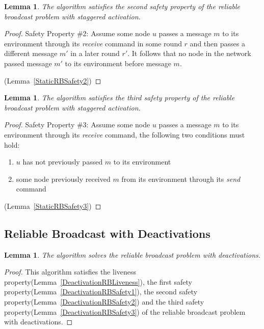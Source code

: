 \documentclass[english]{article}
\newtheorem{lemma}[theorem]{Lemma}
\begin{document}
\begin{lemma}
\label{StaggeredRBSafety2}
The algorithm satisfies the second safety property of the reliable broadcast problem with staggered activation.
\end{lemma}
\begin{proof}
Safety Property \#2: Assume some node $u$ passes a message $m$ to its environment through its \textit{receive} command in some round $r$ and then passes a different message $m'$ in a later round $r'$. It follows that no node in the network passed message $m'$ to its environment before message $m$. 

(Lemma~\ref{StaticRBSafety2})

\end{proof}

\begin{lemma}
\label{StaggeredRBSafety3}
The algorithm satisfies the third safety property of the reliable broadcast problem with staggered activation.
\end{lemma}
\begin{proof}
Safety Property \#3: Assume some node $u$ passes a message $m$ to its environment through its \textit{receive} command, the following two conditions must hold:
  \begin {enumerate}
    \item $u$ has not previously passed $m$ to its environment
    \item some node previously received $m$ from its environment through its \textit{send} command
  \end{enumerate}

(Lemma~\ref{StaticRBSafety3})
\end{proof}



\subsection {Reliable Broadcast with Deactivations}



\begin{lemma}
\label{DeactivationReliableBroadcast}
The algorithm solves the reliable broadcast problem with deactivations.
\end{lemma}
\begin{proof}
This algorithm satisfies the liveness property(Lemma~\ref{DeactivationRBLiveness}), 
the first safety property(Lemma~\ref{DeactivationRBSafety1}),
the second safety property(Lemma~\ref{DeactivationRBSafety2}) and 
the third safety property(Lemma~\ref{DeactivationRBSafety3}) of the reliable broadcast problem with deactivations.
\end{proof}
\end{document}
